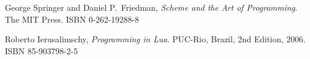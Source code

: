 \begin{thebibliography}{9}

  George Springer and Daniel P.\ Friedman,
  \emph{Scheme and the Art of Programming}.
  The MIT Press.
  ISBN 0-262-19288-8

  Roberto Ierusalimschy,
  \emph{Programming in Lua}.
  PUC-Rio, Brazil,
  2nd Edition,
  2006.
  ISBN 85-903798-2-5
  
\end{thebibliography}
